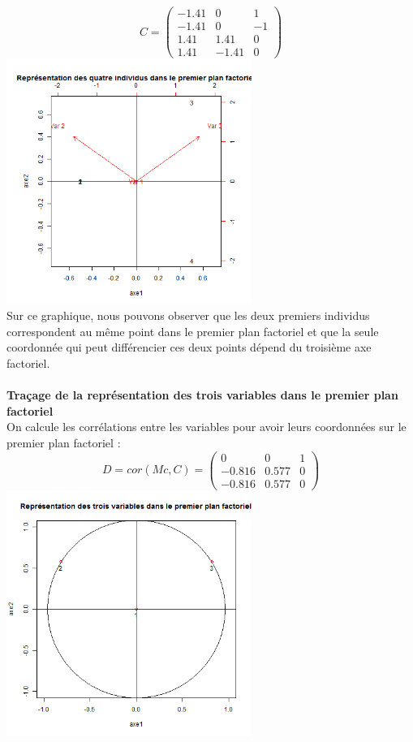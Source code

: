 \documentclass[a4paper, 9pt]{article}
\begin{document}
\[C =
\begin{pmatrix}
-1.41 & 0 & 1\\
-1.41 & 0 & -1\\
1.41 & 1.41 & 0\\
1.41 & -1.41 & 0
\end{pmatrix}\]
\includegraphics[height = 8cm, width = 8cm]{plots/plot_composantes_principales.png}\\
Sur ce graphique, nous pouvons observer que les deux premiers individus correspondent au m\^eme point dans le premier plan factoriel
et que la seule coordonn\'ee qui peut diff\'erencier ces deux points d\'epend du troisi\`eme axe factoriel.\\ \\
\textbf{Traçage de la repr\'esentation des trois variables dans le premier plan factoriel}\\
On calcule les corr\'elations entre les variables pour avoir leurs coordonn\'ees sur le premier plan factoriel :\\
\[D = cor(Mc, C) =
\begin{pmatrix}
0 & 0 & 1\\
-0.816 & 0.577 & 0\\
-0.816 & 0.577 & 0
\end{pmatrix}\]
\includegraphics[height = 8cm, width = 8cm]{plots/plot_correlation.png}\\
\end{document}
